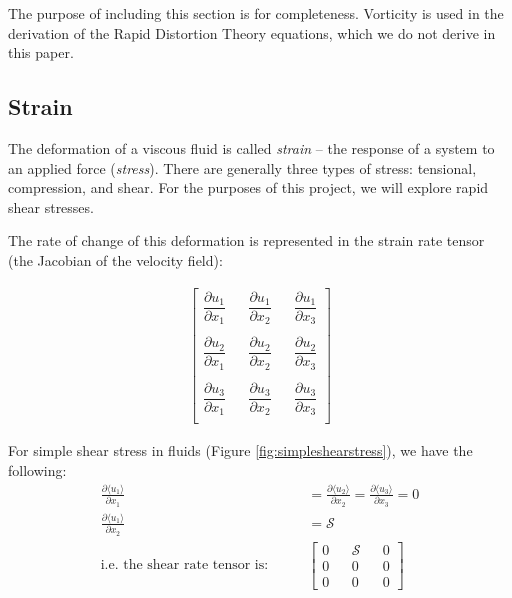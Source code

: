 \documentclass[paper=a4, fontsize=11pt]{scrartcl} %
\numberwithin{equation}{section} %
\numberwithin{figure}{section} %
\numberwithin{table}{section} %
\begin{document}
The purpose of including this section is for completeness. Vorticity is used in the derivation of the Rapid Distortion Theory equations, which we do not derive in this paper.

\subsection{Strain}

The deformation of a viscous fluid is called \textit{strain} -- the response of a system
to an applied force (\textit{stress}). There are generally three types of stress: tensional,
compression, and shear. For the purposes of this project, we will explore rapid shear stresses.

The rate of change of this deformation is represented in the strain rate tensor (the Jacobian of the velocity field):

\begin{align}
    \begin{bmatrix}
        \dfrac{\partial u_1}{\partial x_1} && \dfrac{\partial u_1}{\partial x_2} && \dfrac{\partial u_1}{\partial x_3} \\
        \\
        \dfrac{\partial u_2}{\partial x_1} && \dfrac{\partial u_2}{\partial x_2} && \dfrac{\partial u_2}{\partial x_3} \\
        \\
        \dfrac{\partial u_3}{\partial x_1} && \dfrac{\partial u_3}{\partial x_2} && \dfrac{\partial u_3}{\partial x_3} \\
    \end{bmatrix}
\end{align}


For simple shear stress in fluids (Figure \ref{fig:simpleshearstress}), we have the following:
\begin{align}
    \frac{\partial \langle u_1 \rangle}{\partial x_1} 
        &= \frac{\partial \langle u_2 \rangle}{\partial x_2}
        = \frac{\partial \langle u_3 \rangle}{\partial x_3}
        = 0 \\
    \frac{\partial \langle u_1 \rangle}{\partial x_2} &= \mathcal{S} \\
    \text{i.e. the shear rate tensor is:} \qquad
    &
    \begin{bmatrix}
        0 && \mathcal{S} && 0 \\
        0 && 0 && 0 \\
        0 && 0 && 0
    \end{bmatrix}\label{shearTensor}
\end{align}
\end{document}

